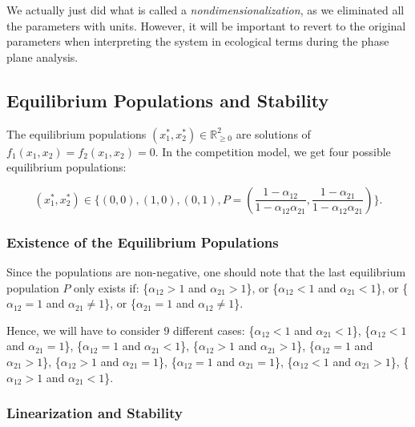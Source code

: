 \documentclass[11pt,a4paper]{scrartcl}
\theoremstyle{definition}
\begin{document}
We actually just did what is called a \textit{nondimensionalization}, as we eliminated all the parameters with units. However, it will be important to revert to the original parameters when interpreting the system in ecological terms during the phase plane analysis.

\subsection{Equilibrium Populations and Stability}

The equilibrium populations $(x_1^{*}, x_2^{*}) \in \mathbb{R}^2_{\geqslant 0}$ are solutions of $f_1(x_1, x_2)=f_2(x_1, x_2)=0$. In the competition model, we get four possible equilibrium populations:

\begin{equation*} 
	(x_1^{*}, x_2^{*})\in\Big\{(0,0), (1,0), (0,1), P=(\frac{1-\alpha_{12}}{1-\alpha_{12}\alpha_{21}}, \frac{1-\alpha_{21}}{1-\alpha_{12}\alpha_{21}}) \Big\}.
\end{equation*}

\subsubsection{Existence of the Equilibrium Populations}

Since the populations are non-negative, one should note that the last equilibrium population $P$ only exists if: \Big\{$\alpha_{12} > 1$ and $\alpha_{21} > 1$\Big\}, or \Big\{$\alpha_{12} < 1$ and $\alpha_{21} < 1$\Big\}, or \Big\{$\alpha_{12}=1$ and $\alpha_{21}\neq 1$\Big\}, or \Big\{$\alpha_{21}=1$ and $\alpha_{12} \neq 1$\Big\}.
\newline

Hence, we will have to consider 9 different cases: \Big\{$\alpha_{12} < 1$ and $\alpha_{21} < 1$\Big\}, \Big\{$\alpha_{12} < 1$ and $\alpha_{21} = 1$\Big\}, \Big\{$\alpha_{12} = 1$ and $\alpha_{21} < 1$\Big\}, \Big\{$\alpha_{12} > 1$ and $\alpha_{21} > 1$\Big\}, \Big\{$\alpha_{12} = 1$ and $\alpha_{21} > 1$\Big\}, \Big\{$\alpha_{12} > 1$ and $\alpha_{21} = 1$\Big\}, \Big\{$\alpha_{12} = 1$ and $\alpha_{21} = 1$\Big\}, \Big\{$\alpha_{12} < 1$ and $\alpha_{21} > 1$\Big\}, \Big\{$\alpha_{12} > 1$ and $\alpha_{21} < 1$\Big\}.

\subsubsection{Linearization and Stability}
\end{document}
